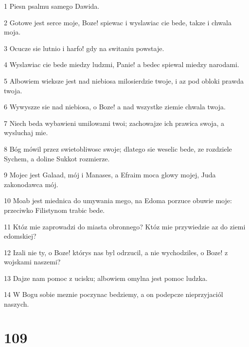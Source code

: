 \par 1 Piesn psalmu samego Dawida.
\par 2 Gotowe jest serce moje, Boze! spiewac i wyslawiac cie bede, takze i chwala moja.
\par 3 Ocucze sie lutnio i harfo! gdy na switaniu powstaje.
\par 4 Wyslawiac cie bede miedzy ludzmi, Panie! a bedec spiewal miedzy narodami.
\par 5 Albowiem wieksze jest nad niebiosa milosierdzie twoje, i az pod obloki prawda twoja.
\par 6 Wywyszze sie nad niebiosa, o Boze! a nad wszystke ziemie chwala twoja.
\par 7 Niech beda wybawieni umilowami twoi; zachowajze ich prawica swoja, a wysluchaj mie.
\par 8 Bóg mówil przez swietobliwosc swoje; dlatego sie weselic bede, ze rozdziele Sychem, a doline Sukkot rozmierze.
\par 9 Mojec jest Galaad, mój i Manases, a Efraim moca glowy mojej, Juda zakonodawca mój.
\par 10 Moab jest miednica do umywania mego, na Edoma porzuce obuwie moje: przeciwko Filistynom trabic bede.
\par 11 Któz mie zaprowadzi do miasta obronnego? Któz mie przywiedzie az do ziemi edomskiej?
\par 12 Izali nie ty, o Boze! którys nas byl odrzucil, a nie wychodziles, o Boze! z wojskami naszemi?
\par 13 Dajze nam pomoc z ucisku; albowiem omylna jest pomoc ludzka.
\par 14 W Bogu sobie meznie poczynac bedziemy, a on podepcze nieprzyjaciól naszych.

\chapter{109}

